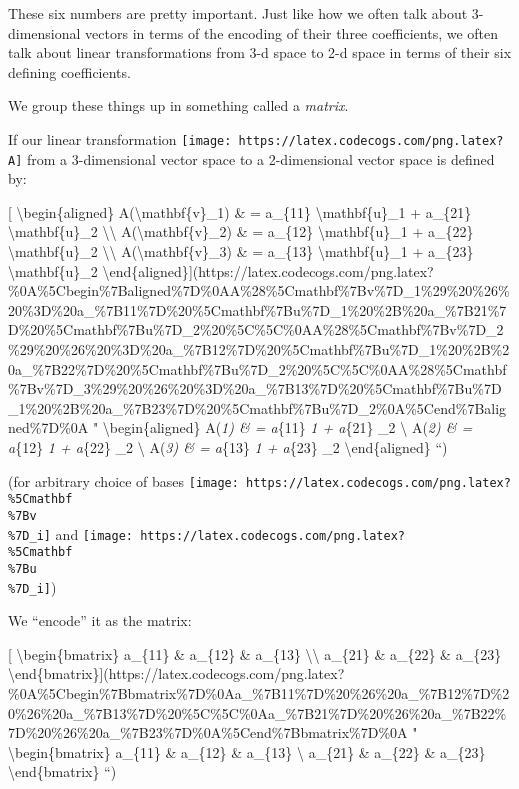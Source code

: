 \documentclass[]{article}
\begin{document}
These six numbers are pretty important. Just like how we often talk about
3-dimensional vectors in terms of the encoding of their three coefficients, we
often talk about linear transformations from 3-d space to 2-d space in terms of
their six defining coefficients.

We group these things up in something called a \emph{matrix}.

If our linear transformation
\texttt{[image: https://latex.codecogs.com/png.latex?A]} from a 3-dimensional
vector space to a 2-dimensional vector space is defined by:

{[} \textbackslash{}begin\{aligned\} A(\textbackslash{}mathbf\{v\}\_1) \& =
a\_\{11\} \textbackslash{}mathbf\{u\}\_1 + a\_\{21\}
\textbackslash{}mathbf\{u\}\_2 \textbackslash{}\textbackslash{}
A(\textbackslash{}mathbf\{v\}\_2) \& = a\_\{12\} \textbackslash{}mathbf\{u\}\_1
+ a\_\{22\} \textbackslash{}mathbf\{u\}\_2 \textbackslash{}\textbackslash{}
A(\textbackslash{}mathbf\{v\}\_3) \& = a\_\{13\} \textbackslash{}mathbf\{u\}\_1
+ a\_\{23\} \textbackslash{}mathbf\{u\}\_2
\textbackslash{}end\{aligned\}{]}(https://latex.codecogs.com/png.latex?\%0A\%5Cbegin\%7Baligned\%7D\%0AA\%28\%5Cmathbf\%7Bv\%7D\_1\%29\%20\%26\%20\%3D\%20a\_\%7B11\%7D\%20\%5Cmathbf\%7Bu\%7D\_1\%20\%2B\%20a\_\%7B21\%7D\%20\%5Cmathbf\%7Bu\%7D\_2\%20\%5C\%5C\%0AA\%28\%5Cmathbf\%7Bv\%7D\_2\%29\%20\%26\%20\%3D\%20a\_\%7B12\%7D\%20\%5Cmathbf\%7Bu\%7D\_1\%20\%2B\%20a\_\%7B22\%7D\%20\%5Cmathbf\%7Bu\%7D\_2\%20\%5C\%5C\%0AA\%28\%5Cmathbf\%7Bv\%7D\_3\%29\%20\%26\%20\%3D\%20a\_\%7B13\%7D\%20\%5Cmathbf\%7Bu\%7D\_1\%20\%2B\%20a\_\%7B23\%7D\%20\%5Cmathbf\%7Bu\%7D\_2\%0A\%5Cend\%7Baligned\%7D\%0A
" \textbackslash{}begin\{aligned\} A(\emph{1) \& = a}\{11\}
\emph{1 + a}\{21\} \_2 \textbackslash{} A(\emph{2)
\& = a}\{12\} \emph{1 + a}\{22\} \_2 \textbackslash{}
A(\emph{3) \& = a}\{13\} \emph{1 + a}\{23\} \_2
\textbackslash{}end\{aligned\} ``)

(for arbitrary choice of bases
\texttt{[image: https://latex.codecogs.com/png.latex?\\\%5Cmathbf\\\%7Bv\\\%7D\_i]} and
\texttt{[image: https://latex.codecogs.com/png.latex?\\\%5Cmathbf\\\%7Bu\\\%7D\_i]})

We ``encode'' it as the matrix:

{[} \textbackslash{}begin\{bmatrix\} a\_\{11\} \& a\_\{12\} \& a\_\{13\}
\textbackslash{}\textbackslash{} a\_\{21\} \& a\_\{22\} \& a\_\{23\}
\textbackslash{}end\{bmatrix\}{]}(https://latex.codecogs.com/png.latex?\%0A\%5Cbegin\%7Bbmatrix\%7D\%0Aa\_\%7B11\%7D\%20\%26\%20a\_\%7B12\%7D\%20\%26\%20a\_\%7B13\%7D\%20\%5C\%5C\%0Aa\_\%7B21\%7D\%20\%26\%20a\_\%7B22\%7D\%20\%26\%20a\_\%7B23\%7D\%0A\%5Cend\%7Bbmatrix\%7D\%0A
" \textbackslash{}begin\{bmatrix\} a\_\{11\} \& a\_\{12\} \& a\_\{13\}
\textbackslash{} a\_\{21\} \& a\_\{22\} \& a\_\{23\}
\textbackslash{}end\{bmatrix\} ``)
\end{document}
